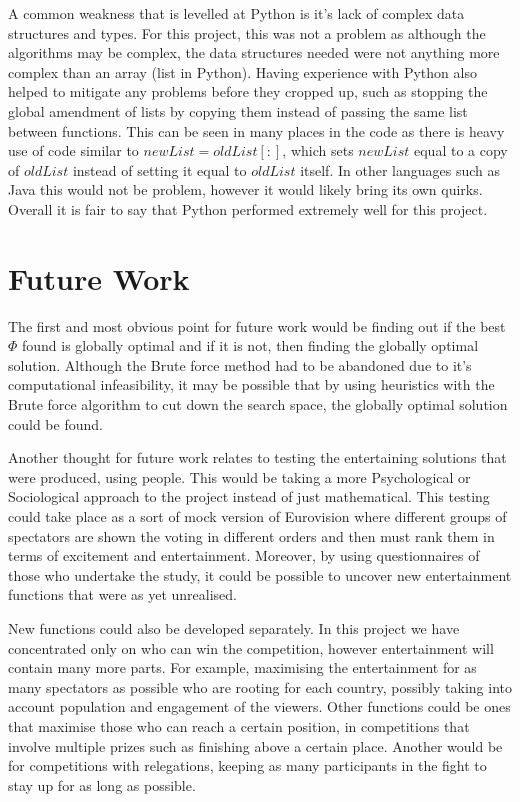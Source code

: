 \documentclass[12pt]{report}
\begin{document}
A common weakness that is levelled at Python is it's lack of complex data structures and types. For this project, this was not a problem as although the algorithms may be complex, the data structures needed were not anything more complex than an array (list in Python). Having experience with Python also helped to mitigate any problems before they cropped up, such as stopping the global amendment of lists by copying them instead of passing the same list between functions. This can be seen in many places in the code as there is heavy use of code similar to $newList = oldList[:]$, which sets $newList$ equal to a copy of $oldList$ instead of setting it equal to $oldList$ itself. In other languages such as Java this would not be problem, however it would likely bring its own quirks. Overall it is fair to say that Python performed extremely well for this project.

\section{Future Work}\label{FutureWork}
The first and most obvious point for future work would be finding out if the best $\Phi$ found is globally optimal and if it is not, then finding the globally optimal solution. Although the Brute force method had to be abandoned due to it's computational infeasibility, it may be possible that by using heuristics with the Brute force algorithm to cut down the search space, the globally optimal solution could be found.

Another thought for future work relates to testing the entertaining solutions that were produced, using people. This would be taking a more Psychological or Sociological approach to the project instead of just mathematical. This testing could take place as a sort of mock version of Eurovision where different groups of spectators are shown the voting in different orders and then must rank them in terms of excitement and entertainment. Moreover, by using questionnaires of those who undertake the study, it could be possible to uncover new entertainment functions that were as yet unrealised.

New functions could also be developed separately. In this project we have concentrated only on who can win the competition, however entertainment will contain many more parts. For example, maximising the entertainment for as many spectators as possible who are rooting for each country, possibly taking into account population and engagement of the viewers. Other functions could be ones that maximise those who can reach a certain position, in competitions that involve multiple prizes such as finishing above a certain place. Another would be for competitions with relegations, keeping as many participants in the fight to stay up for as long as possible.
\end{document}
